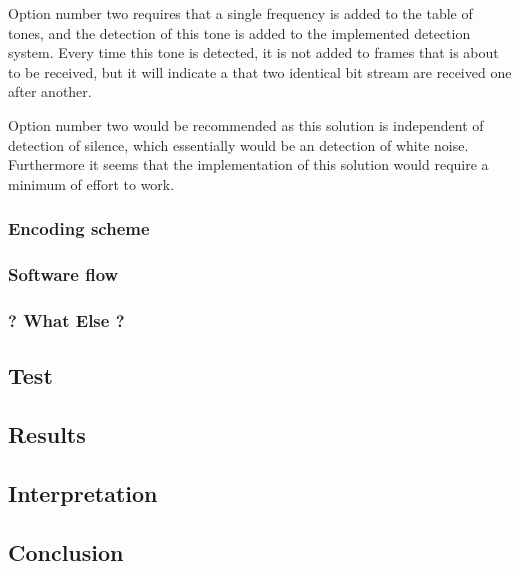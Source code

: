 		Option number two requires that a single frequency is added to the table of tones, and the detection of this tone is added to the implemented
		detection system. Every time this tone is detected, it is not added to frames that is about to be received, but it will indicate a that two
		identical bit stream are received one after another.
		
		Option number two would be recommended as this solution is independent of detection of silence, which essentially would be an detection of
		white noise. Furthermore it seems that the implementation of this solution would require a minimum of effort to work.		
		
		\subsubsection{Encoding scheme}
		
		
		\subsubsection{Software flow}
		
		\subsubsection{? What Else ?}
		
	\subsection{Test}

	\subsection{Results}
	
	\subsection{Interpretation}
	
	\subsection{Conclusion}
